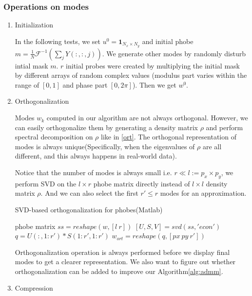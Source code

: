\documentclass{article}
\numberwithin{equation}{section}
\begin{document}
\subsubsection{Operations on modes}
\begin{enumerate}[leftmargin=*,listparindent=20pt] 
\item Initialization

In the following tests, we set $u^{0}=\mathbf{1}_{N_x \times N_y}$ and initial phobe
 $m=\frac{1}{N} \mathcal{F}^{-1}\left(\sum_{j} Y(:,:,j)\right)$. We generate other modes by randomly disturb intial mask $m$.  $r$ initial
probes were created by multiplying the initial mask by different arrays of random complex values (modulus part varies
within the range of $[0,1]$ and phase part $[0,2\pi]$). Then we get $w^0$. 

\item Orthogonalization

Modes $w_k$ computed in our algorithm are not always orthogonal. However, we can easily orthogonalize them by generating a density matrix $\rho$ and perform spectral decomposition on $\rho$ like in \eqref{ort}. The orthogonal representation of modes is always unique(Specifically, when the eigenvalues of $\rho$ are all different, and this always happens in real-world data). 

Notice that the number of modes is always small i.e. $r \ll l := p_x \times p_y$, we perform SVD on the $l \times r$ phobe matrix directly instead of $l \times l$ density matrix $\rho$. And we can also select the first $r'\leq r$ modes for an approximation.

\begin{algorithm}
    \caption{SVD-based orthogonalization for phobes(Matlab)}
    \label{alg:ort}
    phobe matrix $ss = reshape(w,[l\ r])$ \;
    $[U,S,V] = svd(ss,'econ')$ \;
    $q = U(:,1:r')*S(1:r',1:r')$ \;
    $w_{ort} = reshape(q,[px \ py \  r'])$ \;
   
\end{algorithm}
Orthogonalization operation is always performed before we display final modes to get a clearer representation. We also want to figure out whether orthogonalization can be added to improve our Algorithm\ref{alg:admm}.

\item Compression


\end{enumerate}
\end{document}
